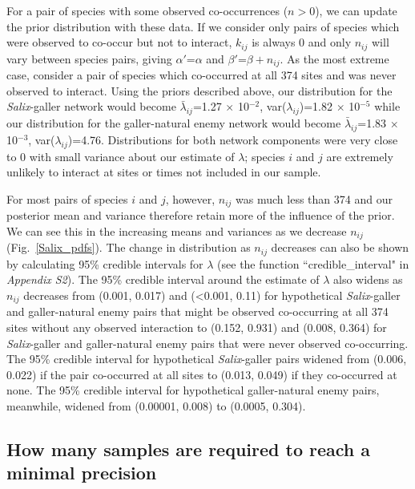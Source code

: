 \documentclass[12pt]{article}
\begin{document}
\begin{spacing}{2.0}
      For a pair of species with some observed co-occurrences ($n>0$), we can update the prior distribution with these data. If we consider only pairs of species which were observed to co-occur but not to interact, $k_{ij}$ is always 0 and only $n_{ij}$ will vary between species pairs, giving $\alpha'$=$\alpha$ and $\beta'$=$\beta + n_{ij}$. As the most extreme case, consider a pair of species which co-occurred at all 374 sites and was never observed to interact. Using the priors described above, our distribution for the \emph{Salix}-galler network would become $\bar\lambda_{ij}$=1.27 $\times$ 10$^{-2}$, var($\lambda_{ij}$)=1.82 $\times$ 10$^{-5}$ while our distribution for the galler-natural enemy network would become $\bar\lambda_{ij}$=1.83 $\times$ 10$^{-3}$, var($\lambda_{ij}$)=4.76. Distributions for both network components were very close to 0 with small variance about our estimate of $\lambda$; species $i$ and $j$ are extremely unlikely to interact at sites or times not included in our sample.


      For most pairs of species $i$ and $j$, however, $n_{ij}$ was much less than 374 and our posterior mean and variance therefore retain more of the influence of the prior. We can see this in the increasing means and variances as we decrease $n_{ij}$ (Fig.~\ref{Salix_pdfs}). The change in distribution as $n_{ij}$ decreases can also be shown  by calculating 95\% credible intervals for $\lambda$ (see the function ``credible\_interval" in \emph{Appendix S2}). The 95\% credible interval around the estimate of $\lambda$ also widens as $n_{ij}$ decreases from (0.001, 0.017) and (\textless0.001, 0.11) for hypothetical \emph{Salix}-galler and galler-natural enemy pairs that might be observed co-occurring at all 374 sites without any observed interaction to (0.152, 0.931) and (0.008, 0.364) for \emph{Salix}-galler and galler-natural enemy pairs that were never observed co-occurring. The 95\% credible interval for hypothetical \emph{Salix}-galler pairs widened from (0.006, 0.022) if the pair co-occurred at all sites to (0.013, 0.049) if they co-occurred at none. The 95\% credible interval for hypothetical galler-natural enemy pairs, meanwhile, widened from (0.00001, 0.008) to (0.0005, 0.304).


  \subsection*{How many samples are required to reach a minimal precision}


\end{spacing}
\end{document}
